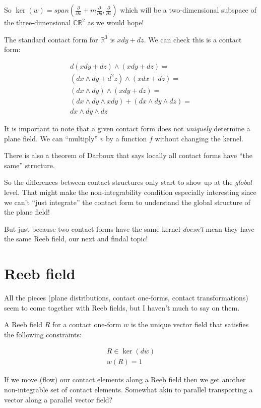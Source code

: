 \documentclass{article}
\theoremstyle{definition}
\begin{document}
So $\ker(w) = span(\frac{\partial}{\partial x} +
    m\frac{\partial}{\partial y}, \frac{\partial}{\partial z})$ which will be a
two-dimensional subspace of the three-dimensional $\mathbb{CR}^{2}$ as we would hope!

The standard contact form for $\mathbb{R}^{3}$ is $xdy + dz$. We can check this
is a contact form:

\begin{align*}
  d (xdy + dz) \wedge (xdy + dz) = \\
  (dx \wedge dy + d^{2} z) \wedge (xdx + dz) = \\
  (dx \wedge dy) \wedge (xdy + dz) = \\
  (dx \wedge dy \wedge xdy) + (dx \wedge dy \wedge dz) = \\
  dx \wedge dy \wedge dz
\end{align*}

It is important to note that a given contact form does not \textit{uniquely}
determine a plane field. We can ``multiply'' $v$ by a function $f$ without
changing the kernel.

There is also a theorem of Darboux that says locally all contact forms have
``the same'' structure.

So the differences between contact structures only start to show up at the
\textit{global} level. That might make the non-integrability condition
especially interesting since we can't ``just integrate'' the contact form to understand
the global structure of the plane field!

But just because two contact forms have the same kernel \textit{doesn't} mean
they have the same Reeb field, our next and findal topic!

\section {Reeb field}

All the pieces (plane distributions, contact one-forms, contact transformations)
seem to come together with Reeb fields, but I haven't much to say on them.

A Reeb field $R$ for a contact one-form $w$ is the unique vector field that satisfies the following constraints:

\begin{gather*}
  R \in \ker(dw) \\
  w(R) = 1
\end{gather*}
  
If we move (flow) our contact elements along a Reeb field then we get another
non-integrable set of contact elements. Somewhat akin to parallel transporting a
vector along a parallel vector field?
\end{document}
